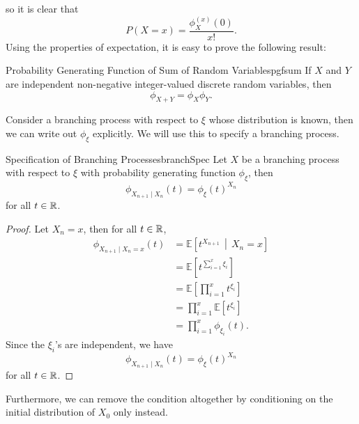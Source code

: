 \documentclass[math, code]{amznotes}
\theoremstyle{remark}
\begin{document}
so it is clear that 
\begin{equation*}
    P\left(X = x\right) = \frac{\phi_X^{(x)}\left(0\right)}{x!}.
\end{equation*}
Using the properties of expectation, it is easy to prove the following result:
\begin{probox}{\small Probability Generating Function of Sum of Random Variables}{pgfsum}
    If $X$ and $Y$ are independent non-negative integer-valued discrete random variables, then 
    \begin{equation*}
        \phi_{X + Y} = \phi_X\phi_Y.
    \end{equation*}
\end{probox}
Consider a branching process with respect to $\xi$ whose distribution is known, then we can write out $\phi_{\xi}$ explicitly. We will use this to specify a branching process.
\begin{probox}{Specification of Branching Processes}{branchSpec}
    Let $X$ be a branching process with respect to $\xi$ with probability generating function $\phi_{\xi}$, then
    \begin{equation*}
        \phi_{X_{n + 1} \mid X_n}\left(t\right) = \phi_{\xi}\left(t\right)^{X_n}
    \end{equation*}
    for all $t \in \mathbb{R}$.
    \tcblower
    \begin{proof}
        Let $X_n = x$, then for all $t \in \mathbb{R}$,
        \begin{align*}
            \phi_{X_{n + 1} \mid X_n = x}\left(t\right) & = \mathbb{E}\left[t^{X_{n + 1}} \,\middle\vert\, X_n = x\right] \\
            & = \mathbb{E}\left[t^{\sum_{i = 1}^{x}\xi_i}\right] \\
            & = \mathbb{E}\left[\prod_{i = 1}^{x}t^{\xi_i}\right] \\
            & = \prod_{i = 1}^{x}\mathbb{E}\left[t^{\xi_i}\right] \\
            & = \prod_{i = 1}^{x}\phi_{\xi_i}\left(t\right).
        \end{align*}
        Since the $\xi_i$'s are independent, we have 
        \begin{equation*}
            \phi_{X_{n + 1} \mid X_n}\left(t\right) = \phi_{\xi}\left(t\right)^{X_n}
        \end{equation*}
        for all $t \in \mathbb{R}$.
    \end{proof}
\end{probox}
Furthermore, we can remove the condition altogether by conditioning on the initial distribution of $X_0$ only instead.
\end{document}
